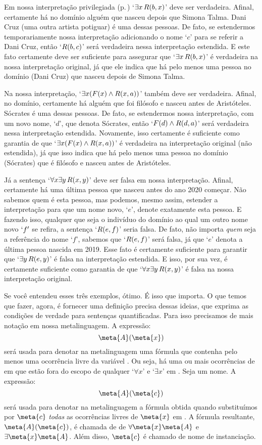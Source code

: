 Em nossa interpretação privilegiada (p.\,\pageref{i:Sample}) `$\exists x\, \mathord{R}(b,x)$' deve ser verdadeira. Afinal, certamente há no domínio alguém que nasceu depois que Simona Talma.
Dani Cruz (uma outra artista potiguar) é uma dessas pessoas.
De fato, se estendermos temporariamente nossa interpretação adicionando o nome `$c$' para se referir a Dani Cruz, então `$\mathord{R}(b,c)$' será verdadeira nessa interpretação estendida.
E este fato certamente deve ser suficiente para assegurar que `$\exists x\,\mathord{R}(b,x)$' é verdadeira na nossa interpretação original, já que ele indica que há pelo menos uma pessoa no domínio (Dani Cruz) que nasceu depois de Simona Talma.

Na nossa interpretação, `$\exists x (\mathord{F}(x) \wedge \mathord{R}(x,a))$' também deve ser verdadeira.
Afinal, no domínio, certamente há alguém que foi filósofo e nasceu antes de Aristóteles.
Sócrates é uma dessas pessoas.
De fato, se estendermos nossa interpretação, com um novo nome, `$d$', que denota Sócrates, então `$\mathord{F}(d) \wedge \mathord{R}(d,a)$' será verdadeira nessa interpretação estendida.
Novamente, isso certamente é suficiente como garantia de que `$\exists x (\mathord{F}(x) \wedge \mathord{R}(x,a))$' é verdadeira na interpretação original (não estendida), já que isso indica que há pelo menos uma pessoa no domínio (Sócrates) que é filósofo e nasceu antes de Aristóteles.

Já a sentença `$\forall x \exists y\, \mathord{R}(x,y)$' deve ser falsa em nossa interpretação.
Afinal, certamente há uma última pessoa que nasceu antes do ano 2020 começar.
Não sabemos quem é esta pessoa, mas podemos, mesmo assim, estender a interpretação para que um nome novo, `$e$', denote exatamente esta pessoa.
E fazendo isso, qualquer que seja o indivíduo do domínio ao qual um outro nome novo $`f'$ se refira, a sentença `$\mathord{R}(e,f)$' seria falsa.
De fato, não importa \emph{quem} seja a referência do nome `$f$', sabemos que `$\mathord{R}(e,f)$' será falsa, já que `$e$' denota a última pessoa nascida em 2019. 
Esse fato é certamente suficiente para garantir que `$\exists y\, \mathord{R}(e,y)$' é falsa na interpretação estendida. E isso, por sua vez, é certamente suficiente como garantia de que `$\forall x \exists y\, \mathord{R}(x,y)$' é falsa na nossa interpretação original.

Se você entendeu esses três exemplos, ótimo. É isso que importa.
O que temos que fazer, agora, é fornecer uma definição precisa dessas ideias, que exprima as condições de verdade para sentenças quantificadas.
Para isso precisamos de mais notação em nossa metalinguagem.
A expressão:
$$\meta{A}(\meta{x})$$
será usada para denotar na metalinguagem uma fórmula que contenha pelo menos uma ocorrência livre da variável .
Ou seja, há uma ou mais ocorrências de  em  que estão fora do escopo de qualquer `$\forall x$' e `$\exists x$' em .
Seja  um nome.
A expressão:
$$\meta{A}(\meta{c})$$
será usada para denotar na metalinguagem a fórmula obtida quando substituímos por $\meta{c}$ \emph{todas} as ocorrências livres de $\meta{x}$ em .
A fórmula resultante, $\meta{A}(\meta{c})$, é chamada de  de $\forall \meta{x} \meta{A}$ e $\exists \meta{x} \meta{A}$.
Além disso, $\meta{c}$ é chamado de nome de instanciação.

